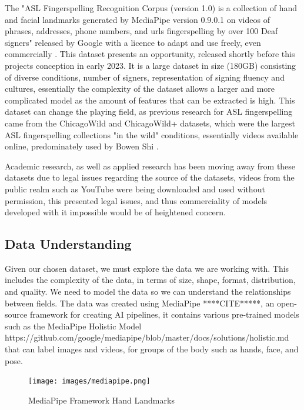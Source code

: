 \documentclass[preprint,11pt,review,authoryear]{elsarticle}
\begin{document}
The "ASL Fingerspelling Recognition Corpus (version 1.0) is a collection of hand and facial landmarks generated by MediaPipe version 0.9.0.1 on videos of phrases, addresses, phone numbers, and urls fingerspelling by over 100 Deaf signers" \cite{asl-fingerspelling} released by Google with a licence to adapt and use freely, even commercially \cite{CCDeedAttribution}. This dataset presents an opportunity, released shortly before this projects conception in early 2023. It is a large dataset in size (180GB) consisting of diverse conditions, number of signers, representation of signing fluency and cultures, essentially the complexity of the dataset allows a larger and more complicated model as the amount of features that can be extracted is high. This dataset can change the playing field, as previous research for ASL fingerspelling came from the ChicagoWild \cite{fs18slt} and ChicagoWild+ \cite{fs18iccv} datasets, which were the largest ASL fingerspelling collections "in the wild" conditions, essentially videos available online, predominately used by Bowen Shi \citep{shiAmericanSignLanguage2018}. 

Academic research, as well as applied research has been moving away from these datasets due to legal issues regarding the source of the datasets, videos from the public realm such as YouTube were being downloaded and used without permission, this presented legal issues, and thus commerciality of models developed with it impossible would be of heightened concern.


\subsection{Data Understanding}

Given our chosen dataset, we must explore the data we are working with. This includes the complexity of the data, in terms of size, shape, format, distribution, and quality. We need to model the data so we can understand the relationships between fields. The data was created using MediaPipe ****CITE*****, an open-source framework for creating AI pipelines, it contains various pre-trained models such as the MediaPipe Holistic Model https://github.com/google/mediapipe/blob/master/docs/solutions/holistic.md that can label images and videos, for groups of the body such as hands, face, and pose.

\begin{figure}[h]
    \centering
    \texttt{[image: images/mediapipe.png]}
    \caption{MediaPipe Framework Hand Landmarks \cite{IMAGE}}
    \label{fig:MediaPipe Framework}
\end{figure}
\end{document}
